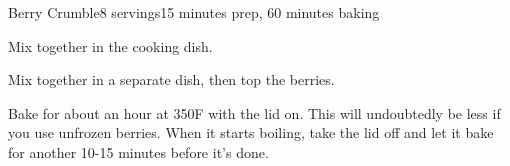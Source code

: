 \documentclass[../Cookbook.tex]{subfiles}
\begin{document}
\begin{recipe}{Berry Crumble}{8 servings}{15 minutes prep, 60 minutes baking}

	Mix together in the cooking dish.

	Mix together in a separate dish, then top the berries.

	\newstep
	Bake for about an hour at 350\0F with the lid on.
	This will undoubtedly be less if you use unfrozen berries.
	When it starts boiling, take the lid off and let it bake for another 10-15 minutes before it's done.


\end{recipe}
\end{document}
